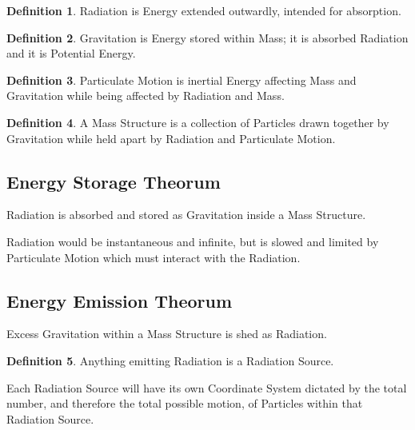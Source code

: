 \documentclass[12pt]{article}
\begin{document}
\theoremstyle{definition}
\newtheorem{defn}{Definition}

\begin{defn}
   Radiation is Energy extended outwardly, intended for absorption.
\end{defn}

\begin{defn}
   Gravitation is Energy stored within Mass; it is absorbed Radiation and it is Potential Energy.
\end{defn}

\begin{defn}
   Particulate Motion is inertial Energy affecting Mass and Gravitation while being affected by Radiation and Mass.
\end{defn}

\begin{defn}
   A Mass Structure is a collection of Particles drawn together by Gravitation while held apart by Radiation and Particulate Motion.
\end{defn}

\subsection{Energy Storage Theorum}
\begin{thm}
   Radiation is absorbed and stored as Gravitation inside a Mass Structure.
\end{thm}

Radiation would be instantaneous and infinite, but is slowed and limited by Particulate Motion which must interact with the Radiation.


\subsection{Energy Emission Theorum}
\begin{thm}
   Excess Gravitation within a Mass Structure is shed as Radiation.
\end{thm}

\begin{defn}
   Anything emitting Radiation is a Radiation Source.
\end{defn}

\begin{thm}
   Each Radiation Source will have its own Coordinate System dictated by the total number, and therefore the total possible motion, of Particles within that Radiation Source.
\end{thm}
\end{document}
